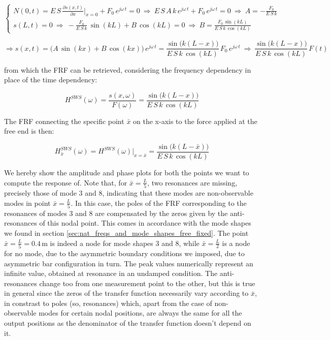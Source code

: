 \documentclass[a4paper,12pt,oneside]{article}
\begin{document}
\[ \begin{cases}
	N(0,t) = E \, S \, \frac{\partial s(x,t)}{\partial x}\Big|_{x=0} +
		F_0 \, e^{j \omega \, t} = 0
		~ \Rightarrow ~ E \, S \, A \, k \, e^{j \omega \, t} +
		F_0 \, e^{j \omega \, t} = 0
		~ \Rightarrow ~ A = -\frac{F_0}{E \, S \, k} \\
	s(L,t) = 0 ~ \Rightarrow ~ -\frac{F_0}{E \, S \, k} \, \sin(kL) + B \, \cos(kL) = 0
		~ \Rightarrow ~ B = \frac{F_0 \, \sin(kL)}{E \, S \, k \, \cos(kL)}
\end{cases} \]

\[
	\Rightarrow s(x,t) = \bigl(A \, \sin(kx) + B \, \cos(kx)\bigl) \, e^{j \omega \, t} =
		\frac{\sin\bigl(k(L - x)\bigr)}{E \, S \, k \, \cos(kL)} \,
		F_0 \, e^{j \omega \, t}
		~ \Rightarrow ~ \frac{\sin\bigl(k(L - x)\bigr)}{E \, S \, k \, \cos(kL)} \, F(t)
\]

from which the FRF can be retrieved, considering the frequency dependency in place of the time dependency:

\[
	H^{SWS}(\omega) = \frac{s(x, \omega)}{F(\omega)} =
		\frac{\sin\bigl(k(L - x)\bigr)}{E \, S \, k \, \cos(kL)}
\]

\vspace{20pt}

The FRF connecting the specific point $ \bar{x} $ on the x-axis to the force applied at the free end is then:

\begin{equation}
\label{eqn:frf_sws}
	H^{SWS}_{\bar{x}}(\omega) = H^{SWS}(\omega)\big|_{x = \bar{x}} =
		\frac{\sin\bigl(k(L - \bar{x})\bigr)}{E \, S \, k \, \cos(kL)}
\end{equation}

\vspace{20pt}

We hereby show the amplitude and phase plots for both the points we want to compute the response of. Note that, for $ \bar{x} = \frac{L}{5} $, two resonances are missing, precisely those of mode 3 and 8, indicating that these modes are non-observable modes in point $ \bar{x} = \frac{L}{5} $. In this case, the poles of the FRF corresponding to the resonances of modes 3 and 8 are compensated by the zeros given by the anti-resonances of this nodal point. This comes in accordance with the mode shapes we found in section \ref{sec:nat_freqs_and_mode_shapes_free_fixed}. The point $ \bar{x} = \frac{L}{5} = 0.4 \, \text{m} $ is indeed a node for mode shapes 3 and 8, while $ \bar{x} = \frac{L}{2} $ is a node for no mode, due to the asymmetric boundary conditions we imposed, due to asymmetric bar configuration in turn. The peak values numerically represent an infinite value, obtained at resonance in an undamped condition. The anti-resonances change too from one measurement point to the other, but this is true in general since the zeros of the transfer function necessarily vary according to $ \bar{x} $, in constrast to poles (so, resonances) which, apart from the case of non-observable modes for certain nodal positions, are always the same for all the output positions as the denominator of the transfer function doesn't depend on it.
\end{document}
